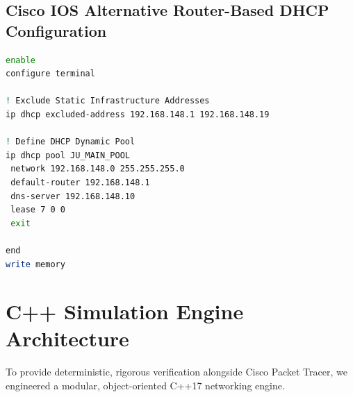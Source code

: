 \documentclass[12pt, a4paper]{article}
\begin{document}
\subsection{Cisco IOS Alternative Router-Based DHCP Configuration}
\begin{lstlisting}[language=bash, caption={Cisco IOS Embedded DHCP Server Pool}]
enable
configure terminal

! Exclude Static Infrastructure Addresses
ip dhcp excluded-address 192.168.148.1 192.168.148.19

! Define DHCP Dynamic Pool
ip dhcp pool JU_MAIN_POOL
 network 192.168.148.0 255.255.255.0
 default-router 192.168.148.1
 dns-server 192.168.148.10
 lease 7 0 0
 exit

end
write memory
\end{lstlisting}

\section{C++ Simulation Engine Architecture}

To provide deterministic, rigorous verification alongside Cisco Packet Tracer, we engineered a modular, object-oriented C++17 networking engine.
\end{document}
